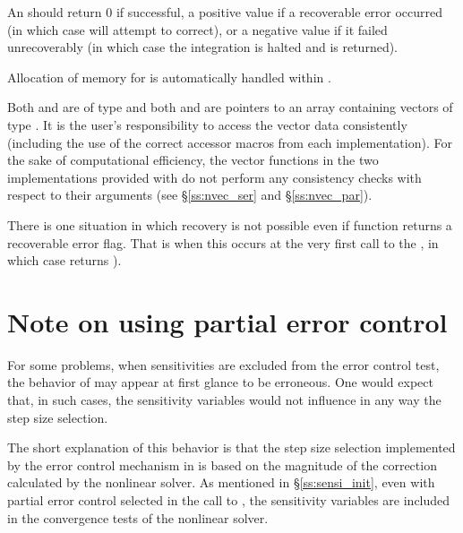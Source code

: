 {
  An  should return 0 if successful, a positive value if a recoverable
  error occurred (in which case {\idas} will attempt to correct), or a negative 
  value if it failed unrecoverably (in which case the integration is halted and
   is returned).
}
{
  Allocation of memory for  is automatically handled within {\idas}.

  Both  and  are of type  and both  and 
  are pointers to an array containing  vectors of type .
  It is the user's responsibility to access the vector data consistently 
  (including the use of the correct accessor macros from each {\nvector} implementation). 
  For the sake of computational efficiency, the vector functions in the two {\nvector} 
  implementations provided with {\idas} do not perform any consistency checks with respect 
  to their  arguments (see \S\ref{ss:nvec_ser} and \S\ref{ss:nvec_par}).

  There is one situation in which recovery is not possible even if
   function returns a recoverable error flag.  That is when
  this occurs at the very first call to the , in which case
  {\idas} returns ).
}


\section{Note on using partial error control}\label{ss:partial}
For some problems, when sensitivities are excluded from the error control test, 
the behavior of {\idas} may appear at first glance to be erroneous. One would
expect that, in such cases, the sensitivity variables would not influence in
any way the step size selection.

The short explanation of this behavior is that the step size selection
implemented by the error control mechanism in {\idas} is based on the 
magnitude of the correction calculated by the nonlinear solver. As mentioned
in \S\ref{ss:sensi_init}, even with partial error control selected
in the call to , the sensitivity variables are included
in the convergence tests of the nonlinear solver.

